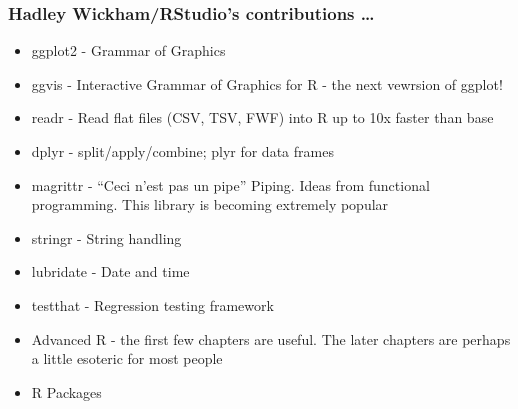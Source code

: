 \documentclass{beamer}
\begin{document}

\begin{frame}
\frametitle{Hadley Wickham/RStudio's contributions \ldots}
\begin{itemize}
\item ggplot2 - Grammar of Graphics
\item ggvis - Interactive Grammar of Graphics for R - the next vewrsion of ggplot!
\item readr - Read flat files (CSV, TSV, FWF) into R up to 10x faster than base
\item dplyr - split/apply/combine; plyr for data frames
\item magrittr - ``Ceci n'est pas un pipe'' Piping. Ideas from functional programming.
			This library is becoming extremely popular
\item stringr - String handling
\item lubridate - Date and time
\item testthat - Regression testing framework
\item Advanced R - the first few chapters are useful. The later chapters are perhaps a little
			esoteric for most people
\item R Packages
\end{itemize}
\end{frame}
\end{document}
